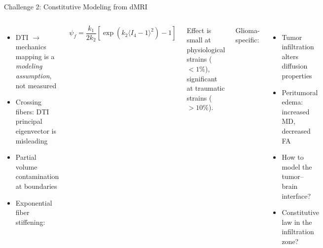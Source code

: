 \begin{frame}{Challenge 2: Constitutive Modeling from dMRI}

  \begin{columns}[T]
    \begin{itemize}
      \item DTI $\to$ mechanics mapping is a \emph{modeling assumption},
        not measured \cite{Giordano2014}
      \item Crossing fibers: DTI principal eigenvector is misleading
      \item Partial volume contamination at boundaries
      \item Exponential fiber stiffening:
    \end{itemize}

    \[
      \psi_f = \frac{k_1}{2k_2}
        \left[\exp(k_2 \langle I_4 - 1\rangle^2) - 1\right]
    \]

    Effect is small at physiological strains ($< 1\%$),\\
    significant at traumatic strains ($> 10\%$).

    \alert{Glioma-specific:}
    \begin{itemize}
      \item Tumor infiltration alters diffusion properties
      \item Peritumoral edema: increased MD, decreased FA
      \item How to model the tumor--brain interface?
      \item Constitutive law in the infiltration zone?
    \end{itemize}
  \end{columns}

\end{frame}

